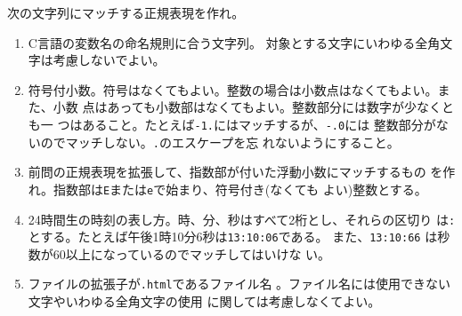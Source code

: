 \begin{Prob}\upshape\Must
次の文字列にマッチする正規表現を作れ。
\begin{enumerate}
 \item C言語の変数名の命名規則に合う文字列\ifText 。
			 対象とする文字にいわゆる全角文字は考慮しないでよい。\\[0.05\textheight]\fi
 \item 符号付小数。符号はなくてもよい。整数の場合は小数点はなくてもよい。また、小数
       点はあっても小数部はなくてもよい。整数部分には数字が少なくとも一
       つはあること。たとえば\Verb+-1.+にはマッチするが、\Verb+-.0+には
       整数部分がないのでマッチしない。\Verb+.+のエスケープを忘
       れないようにすること。\ifText\\[0.05\textheight]\fi
 \item 前問の正規表現を拡張して、指数部が付いた浮動小数にマッチするもの
       を作れ。指数部は\Verb+E+または\Verb+e+で始まり、符号付き(なくても
       よい)整数とする。\ifText\\[0.05\textheight]\fi
 \item 24時間生の時刻の表し方。時、分、秒はすべて2桁とし、それらの区切り
       は\Verb+:+とする。たとえば午後1時10分6秒は\Verb+13:10:06+である。
  また、\Verb+13:10:66+ は秒数が60以上になっているのでマッチしてはいけな
       い。
       \ifText\\[0.05\textheight]\fi
 \item ファイルの拡張子が\texttt{.html}であるファイル名
			 \ifText 。ファイル名には使用できない文字やいわゆる全角文字の使用
			 に関しては考慮しなくてよい。\\[0.05\textheight]\fi
\end{enumerate}
\end{Prob}
